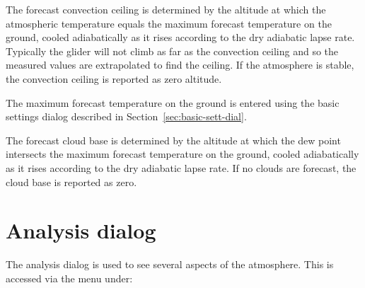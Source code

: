 \documentclass[a4paper,12pt]{refrep}
\begin{document}
The forecast convection ceiling is determined by the altitude at which
the atmospheric temperature equals the maximum forecast temperature on
the ground, cooled adiabatically as it rises according to the dry
adiabatic lapse rate.  Typically the glider will not climb as far as
the convection ceiling and so the measured values are extrapolated to
find the ceiling.  If the atmosphere is stable, the convection ceiling
is reported as zero altitude.

The maximum forecast temperature on the ground is entered using the
basic settings dialog described in Section~\ref{sec:basic-sett-dial}.


%

The forecast cloud base is determined by the altitude at which the dew
point intersects the maximum forecast temperature on the ground,
cooled adiabatically as it rises according to the dry adiabatic lapse
rate.  If no clouds are forecast, the cloud base is reported as zero.


\section{Analysis dialog}

The analysis dialog is used to see several aspects of the atmosphere.
This is accessed via the menu under:
\begin{quote}
\blink{}
\end{quote}
\end{document}
